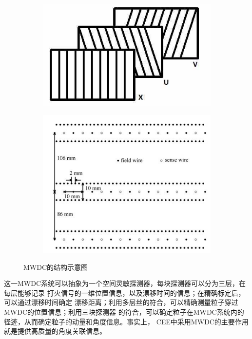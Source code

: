 \documentclass[bachelor,openany,oneside,color]{buaathesis}
\begin{document}
\begin{figure}
	\centering
	\begin{subfigure}{0.4\textwidth}
		\includegraphics[width=\textwidth]{./resource/CEE-MWDC-Layer.jpg}
		\label{fig:det:MWDC:Layer}
	\end{subfigure}
	\begin{subfigure}{0.4\textwidth}
		\includegraphics[width=\textwidth]{./resource/CEE-MWDC-Layout.png}
		\label{fig:det:MWDC:Layout}
	\end{subfigure}
	\caption{MWDC的结构示意图}\label{fig:det:MWDC}
\end{figure}

这一MWDC系统可以抽象为一个空间灵敏探测器，每块探测器可以分为三层，在每层能够记录
打火信号的一维位置信息，以及漂移时间的信息；在精确标定后，可以通过漂移时间确定
漂移距离；利用多层丝的符合，可以精确测量粒子穿过MWDC的位置信息；利用三块探测器
的符合，可以确定粒子在MWDC系统内的径迹，从而确定粒子的动量和角度信息。事实上，
CEE中采用MWDC的主要作用就是提供高质量的角度关联信息。
\end{document}
